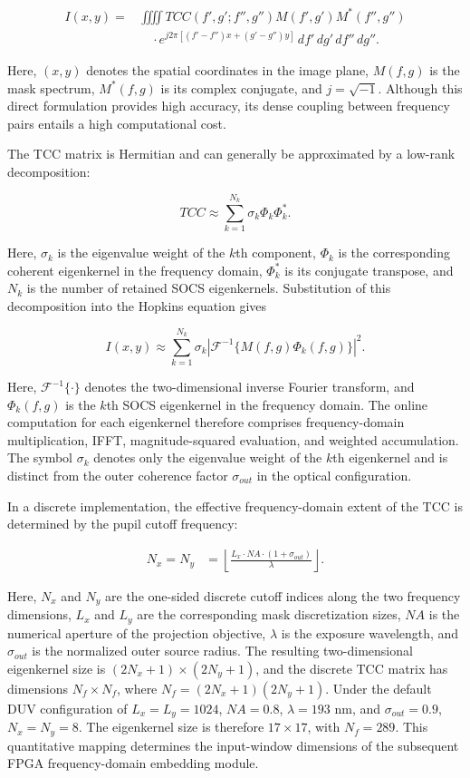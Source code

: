 \documentclass[
  preprint]{elsarticle}
\begin{document}
\[
\begin{aligned}
I(x,y)={}&\iiiint TCC(f',g';f'',g'')M(f',g')M^*(f'',g'')\\
&\quad\cdot e^{j2\pi[(f'-f'')x+(g'-g'')y]}
\,df'\,dg'\,df''\,dg''.
\end{aligned}
\tag{2}
\]

Here, \((x,y)\) denotes the spatial coordinates in the image plane,
\(M(f,g)\) is the mask spectrum, \(M^*(f,g)\) is its complex conjugate,
and \(j=\sqrt{-1}\). Although this direct formulation provides high
accuracy, its dense coupling between frequency pairs entails a high
computational cost.

The TCC matrix is Hermitian and can generally be approximated by a
low-rank decomposition:

\[
TCC \approx \sum_{k=1}^{N_k}\sigma_k\Phi_k\Phi_k^*.
\tag{3}
\]

Here, \(\sigma_k\) is the eigenvalue weight of the \(k\)th component,
\(\Phi_k\) is the corresponding coherent eigenkernel in the frequency
domain, \(\Phi_k^*\) is its conjugate transpose, and \(N_k\) is the
number of retained SOCS eigenkernels. Substitution of this decomposition
into the Hopkins equation gives

\[
I(x,y) \approx
\sum_{k=1}^{N_k}\sigma_k
\left|\mathcal{F}^{-1}\{M(f,g)\Phi_k(f,g)\}\right|^2.
\tag{4}
\]

Here, \(\mathcal{F}^{-1}\{\cdot\}\) denotes the two-dimensional inverse
Fourier transform, and \(\Phi_k(f,g)\) is the \(k\)th SOCS eigenkernel
in the frequency domain. The online computation for each eigenkernel
therefore comprises frequency-domain multiplication, IFFT,
magnitude-squared evaluation, and weighted accumulation. The symbol
\(\sigma_k\) denotes only the eigenvalue weight of the \(k\)th
eigenkernel and is distinct from the outer coherence factor
\(\sigma_{out}\) in the optical configuration.

In a discrete implementation, the effective frequency-domain extent of
the TCC is determined by the pupil cutoff frequency:

\[
\begin{aligned}
N_x=N_y
&=\left\lfloor
\frac{L_x\cdot NA\cdot(1+\sigma_{out})}{\lambda}
\right\rfloor .
\end{aligned}
\tag{5}
\]

Here, \(N_x\) and \(N_y\) are the one-sided discrete cutoff indices
along the two frequency dimensions, \(L_x\) and \(L_y\) are the
corresponding mask discretization sizes, \(NA\) is the numerical
aperture of the projection objective, \(\lambda\) is the exposure
wavelength, and \(\sigma_{out}\) is the normalized outer source radius.
The resulting two-dimensional eigenkernel size is
\((2N_x+1)\times(2N_y+1)\), and the discrete TCC matrix has dimensions
\(N_f\times N_f\), where \(N_f=(2N_x+1)(2N_y+1)\). Under the default DUV
configuration of \(L_x=L_y=1024\), \(NA=0.8\), \(\lambda=193\) nm, and
\(\sigma_{out}=0.9\), \(N_x=N_y=8\). The eigenkernel size is therefore
\(17 \times 17\), with \(N_f=289\). This quantitative mapping determines
the input-window dimensions of the subsequent FPGA frequency-domain
embedding module.
\end{document}
